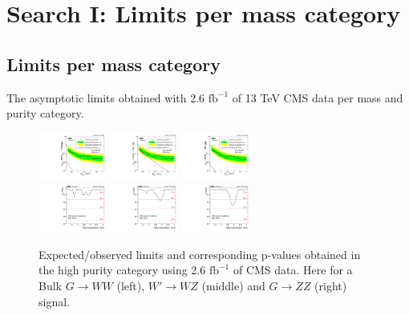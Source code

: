 \chapter{Search I: Limits per mass category}
\vspace*{\fill}\newpage
\section{Limits per mass category}
\label{app:search1}
The asymptotic limits obtained with 2.6 $\textrm{fb}^{-1}$ of 13 TeV CMS data per mass and purity category.

\begin{figure}[h!]
\centering
\includegraphics[width=0.20\textwidth]{figures/analysis/search1/AN-15-211/limits/brazilianFlag_BulkWW_VVHP_new_combined_purity_13TeV_wPDF.pdf}
\includegraphics[width=0.20\textwidth]{figures/analysis/search1/AN-15-211/limits/brazilianFlag_WZ_VVHP_new_combined_purity_13TeV_wPDF.pdf}
\includegraphics[width=0.20\textwidth]{figures/analysis/search1/AN-15-211/limits/brazilianFlag_BulkZZ_VVHP_new_combined_purity_13TeV_wPDF.pdf}\\
\includegraphics[width=0.20\textwidth]{figures/analysis/search1/AN-15-211/pvalues/pvalue_BulkWWinVVnew_high_purity.pdf}
\includegraphics[width=0.20\textwidth]{figures/analysis/search1/AN-15-211/pvalues/pvalue_WZinVVnew_high_purity.pdf}
\includegraphics[width=0.20\textwidth]{figures/analysis/search1/AN-15-211/pvalues/pvalue_BulkZZinVVnew_high_purity.pdf}
\caption{Expected/observed limits and corresponding p-values obtained in the high purity category using 2.6 $\textrm{fb}^{-1}$ of CMS data. Here for a Bulk $G\rightarrow WW$ (left), $W'\rightarrow WZ$ (middle) and $G\rightarrow ZZ$ (right) signal.}
\label{fig:app:Limits_HP}
\end{figure}

